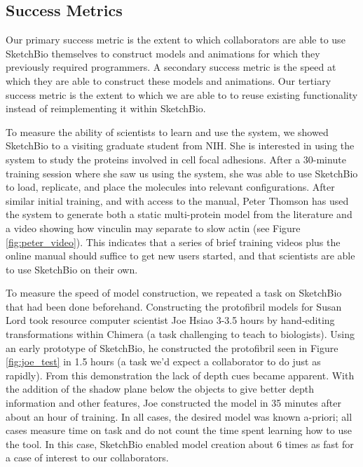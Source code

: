 \documentclass[twocolumn]{bmcart}%
\begin{document}
\subsection*{Success Metrics}
Our primary success metric is the extent to which collaborators are able to use SketchBio themselves to construct models and animations for which they previously required programmers.  A secondary success metric is the speed at which they are able to construct these models and animations.  Our tertiary success metric is the extent to which we are able to to reuse existing functionality instead of reimplementing it within SketchBio.

To measure the ability of scientists to learn and use the system, we showed SketchBio to a visiting graduate student from NIH.  She is interested in using the system to study the proteins involved in cell focal adhesions.  After a 30-minute training session where she saw us using the system, she was able to use SketchBio to load, replicate, and place the molecules into relevant configurations.  After similar initial training, and with access to the manual, Peter Thomson has used the system to generate both a static multi-protein model from the literature and a video showing how vinculin may separate to slow actin (see Figure \ref{fig:peter_video}).   This indicates that a series of brief training videos plus the online manual should suffice to get new users started, and that scientists are able to use SketchBio on their own.

To measure the speed of model construction, we repeated a task on SketchBio that had been done beforehand.  Constructing the protofibril models for Susan Lord took resource computer scientist Joe Hsiao 3-3.5 hours by hand-editing transformations within Chimera (a task challenging to teach to biologists).  Using an early prototype of SketchBio, he constructed the protofibril seen in Figure \ref{fig:joe_test} in 1.5 hours (a task we'd expect a collaborator to do just as rapidly).  From this demonstration the lack of depth cues became apparent.  With the addition of the shadow plane below the objects to give better depth information and other features, Joe constructed the model in 35 minutes after about an hour of training.  In all cases, the desired model was known a-priori; all cases measure time on task and do not count the time spent learning how to use the tool.  In this case, SketchBio enabled model creation about 6 times as fast for a case of interest to our collaborators.
\end{document}
